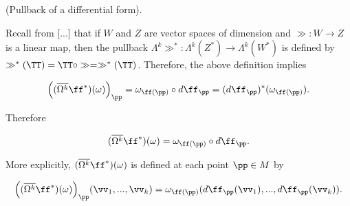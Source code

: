 \begin{theorem}
    (Pullback of a differential form).
    
    Recall from [...] that if $W$ and $Z$ are vector spaces of dimension and $\gg:W \rightarrow Z$ is a linear map, then the pullback $\Lambda^k \gg^*:\Lambda^k(Z^*) \rightarrow \Lambda^k(W^*)$ is defined by $\gg^*(\TT) = \TT \circ \gg = \gg^*(\TT)$. Therefore, the above definition implies
    
    \begin{align*}
        \Big( (\overline{\Omega^k} \ff^*)(\omega) \Big)_\pp = \omega_{\ff(\pp)} \circ d\ff_\pp = (d\ff_\pp)^*(\omega_{\ff(\pp)}).
    \end{align*}
    
    Therefore
    
    \begin{align*}
        (\overline{\Omega^k} \ff^*)(\omega) = \omega_{\ff(\pp)} \circ d\ff_\pp.
    \end{align*}
    
    More explicitly, $(\overline{\Omega^k} \ff^*)(\omega)$ is defined at each point $\pp \in M$ by
    
    \begin{align*}
        \Big((\overline{\Omega^k} \ff^*)(\omega) \Big)_\pp (\vv_1, ..., \vv_k) = \omega_{\ff(\pp)}(d\ff_\pp(\vv_1), ..., d\ff_\pp(\vv_k)).
    \end{align*}
\end{theorem}

